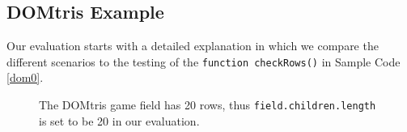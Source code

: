 


\subsection{DOMtris Example}
Our evaluation starts with a detailed explanation in which we compare the different scenarios to the testing of the {\tt function checkRows()} in Sample Code \ref{dom0}.

\begin{figure}
\centerline{}
\caption[DOMtris game field]{The DOMtris game field has 20 rows, thus {\tt field.children.length} is set to be 20 in our evaluation.}
\label{domtrisfield}
\end{figure}

